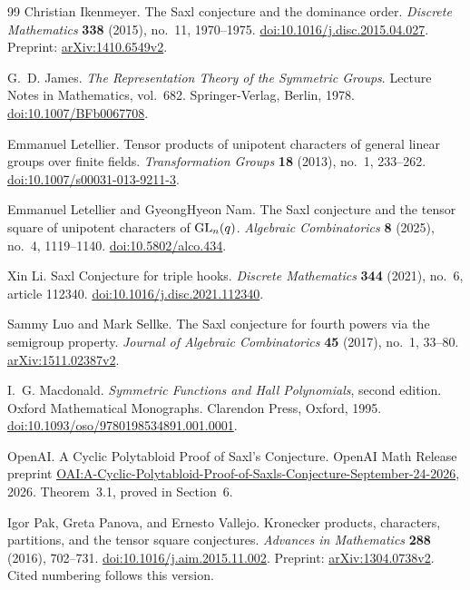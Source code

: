 \begin{thebibliography}{99}
Christian Ikenmeyer.
The Saxl conjecture and the dominance order.
\emph{Discrete Mathematics} \textbf{338} (2015), no.~11, 1970--1975.
\href{https://doi.org/10.1016/j.disc.2015.04.027}{doi:10.1016/j.disc.2015.04.027}.
Preprint: \href{https://arxiv.org/abs/1410.6549v2}{arXiv:1410.6549v2}.

G.~D. James.
\emph{The Representation Theory of the Symmetric Groups}.
Lecture Notes in Mathematics, vol.~682.
Springer-Verlag, Berlin, 1978.
\href{https://doi.org/10.1007/BFb0067708}{doi:10.1007/BFb0067708}.

Emmanuel Letellier.
Tensor products of unipotent characters of general linear groups over finite fields.
\emph{Transformation Groups} \textbf{18} (2013), no.~1, 233--262.
\href{https://doi.org/10.1007/s00031-013-9211-3}{doi:10.1007/s00031-013-9211-3}.

Emmanuel Letellier and GyeongHyeon Nam.
The Saxl conjecture and the tensor square of unipotent characters of
$\operatorname{GL}_n(q)$.
\emph{Algebraic Combinatorics} \textbf{8} (2025), no.~4, 1119--1140.
\href{https://doi.org/10.5802/alco.434}{doi:10.5802/alco.434}.

Xin Li.
Saxl Conjecture for triple hooks.
\emph{Discrete Mathematics} \textbf{344} (2021), no.~6, article 112340.
\href{https://doi.org/10.1016/j.disc.2021.112340}{doi:10.1016/j.disc.2021.112340}.

Sammy Luo and Mark Sellke.
The Saxl conjecture for fourth powers via the semigroup property.
\emph{Journal of Algebraic Combinatorics} \textbf{45} (2017), no.~1, 33--80.
\href{https://arxiv.org/abs/1511.02387v2}{arXiv:1511.02387v2}.

I.~G. Macdonald.
\emph{Symmetric Functions and Hall Polynomials}, second edition.
Oxford Mathematical Monographs.
Clarendon Press, Oxford, 1995.
\href{https://doi.org/10.1093/oso/9780198534891.001.0001}{doi:10.1093/oso/9780198534891.001.0001}.

{\raggedright
OpenAI.
A Cyclic Polytabloid Proof of Saxl's Conjecture.
OpenAI Math Release preprint
\href{https://github.com/openai/math/blob/main/preprints/A-Cyclic-Polytabloid-Proof-of-Saxls-Conjecture-September-24-2026/paper.pdf}{OAI:A-Cyclic-Polytabloid-Proof-of-Saxls-Conjecture-September-24-2026},
2026. Theorem~3.1, proved in Section~6.
\par}

Igor Pak, Greta Panova, and Ernesto Vallejo.
Kronecker products, characters, partitions, and the tensor square conjectures.
\emph{Advances in Mathematics} \textbf{288} (2016), 702--731.
\href{https://doi.org/10.1016/j.aim.2015.11.002}{doi:10.1016/j.aim.2015.11.002}.
Preprint: \href{https://arxiv.org/abs/1304.0738v2}{arXiv:1304.0738v2}.
Cited numbering follows this version.


\end{thebibliography}
